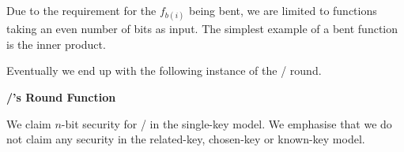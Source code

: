 Due to the requirement for the $f_{b(i)}$ being bent, we are limited to functions taking an even number of bits as input.
The simplest example of a bent function is the inner product.

Eventually we end up with the following instance of the \WSN/ round.

\begin{center}
\begin{minipage}{\textwidth}
    \centering
    \textbf{\bison/'s Round Function}\\[0.5\baselineskip]
\end{minipage}
\end{center}

\begin{secclaim}[\bison/]
  We claim $n$-bit security for \bison/ in the single-key model.
  We emphasise that we do not claim any security in the related-key, chosen-key or known-key model.
\end{secclaim}

